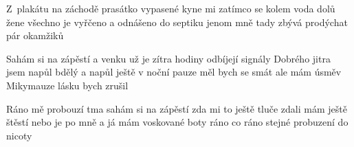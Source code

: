 \documentclass{song}
\begin{document}
\begin{multicols}{2}
\strophe*
Z~plakátu na záchodě prasátko vypasené
kyne mi zatímco se kolem voda dolů žene
všechno je vyřčeno a odnášeno do septiku
jenom mně tady zbývá prodýchat pár okamžiků
\endstrophe

Sahám si na zápěstí a venku už je zítra
hodiny odbíjejí signály Dobrého jitra
jsem napůl bdělý a napůl ještě v noční pauze
měl bych se smát ale mám úsměv Mikymauze
lásku bych zrušil
\endstrophe

\strophe*
Ráno mě probouzí tma sahám si na zápěstí
zda mi to ještě tluče zdali mám ještě štěstí
nebo je po mně a já mám voskované boty
ráno co ráno stejné probuzení do nicoty
\endstrophe

\end{multicols}
\end{document}
